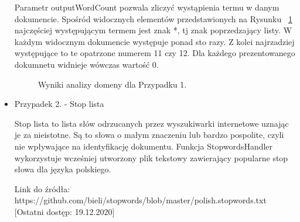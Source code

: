 \documentclass{classrep}
\begin{document}
\begin{itemize}
    Parametr outputWordCount pozwala zliczyć wystąpienia termu w danym dokumencie. Spośród widocznych elementów przedstawionych na Rysunku ~\ref{FTIMS_case1_wordCount}  najczęściej występującym termem jest znak *, tj znak poprzedzający listy. W każdym widocznym dokumencie występuje ponad sto razy. Z kolei najrzadziej występujące to te opatrzone numerem 11 czy 12. Dla każdego prezentowanego dokumnetu widnieje wówczas wartość 0.
    
    \begin{table}[H]
    \centering
    \caption{Parametry zastosowanego filtra StringToWordVector dla przypadku 1.}
    \end{table}
   
   
    \begin{figure}[H] 
    	\begin{center}
        \caption{Wyniki analizy domeny dla Przypadku 1.}
        \label{FTIMS_case1_wordCount}
    	\end{center}
    \end{figure}


 \item  Przypadek 2. - Stop lista
 
    Stop lista to lista słów odrzucanych przez wyszukiwarki internetowe uznając je za nieistotne. Są to słowa o małym znaczeniu lub bardzo pospolite, czyli nie wpływające na identyfikację dokumentu.
    Funkcja StopwordsHandler wykorzystuje wcześniej utworzony plik tekstowy zawierający popularne stop słowa dla języka polskiego. 
    
    Link do źródła: https://github.com/bieli/stopwords/blob/master/polish.stopwords.txt [Ostatni dostęp: 19.12.2020]
    \begin{table}[H]
    \centering
    \caption{Parametry zastosowanego filtra StringToWordVector dla przypadku 2.}
    \label{tab:apriori_num_params}
    \end{table}
    

\end{itemize}
\end{document}
